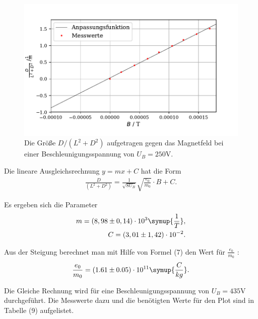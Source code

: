 \begin{figure}[H]
  \centering
  \includegraphics{plot1.pdf}
  \caption{Die Größe $D/(L^2+D^2)$ aufgetragen gegen das Magnetfeld bei einer Beschleunigungsspannung von $U_B = 250\si{\volt}$.}
  \label{fig:plot}
\end{figure}

Die lineare Ausgleichsrechnung $y = mx+C$ hat die Form
\begin{align*}
    \frac{D}{(L^2+D^2)} = \frac{1}{\sqrt{8U_B}}\sqrt{\frac{e_0}{m_0}} \cdot B + C .
\end{align*}

Es ergeben sich die Parameter
\begin{align*}
    m = (8,98 \pm 0,14) \cdot 10^{3} \symup{\frac{1}{T}},\\
    C = (3,01 \pm 1,42) \cdot 10^{-2} .
\end{align*}

Aus der Steigung berechnet man mit Hilfe von Formel (7) den Wert für $\frac{e_0}{m_0}$ :
\begin{align*}
\frac{e_0}{m_0} = (1.61 \pm 0.05) \cdot 10^{11} \symup{\frac{C}{kg}}.
\end{align*}

\noindent Die Gleiche Rechnung wird für eine Beschleunigungsspannung von $U_B = 435\si{\volt}$ durchgeführt. Die Messwerte dazu und die benötigten Werte für den Plot sind in Tabelle (9) aufgelistet.

